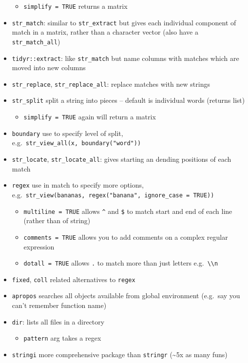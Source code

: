 \documentclass[]{book}
\providecommand{\tightlist}{%
  \setlength{\itemsep}{0pt}\setlength{\parskip}{0pt}}
\theoremstyle{definition}
\theoremstyle{definition}
\theoremstyle{definition}
\theoremstyle{remark}
\begin{document}
\begin{itemize}
  \begin{itemize}
  \tightlist
  \item
    \texttt{simplify\ =\ TRUE} returns a matrix
  \end{itemize}
\item
  \texttt{str\_match}: similar to \texttt{str\_extract} but gives each
  individual component of match in a matrix, rather than a character
  vector (also have a \texttt{str\_match\_all})
\item
  \texttt{tidyr::extract}: like \texttt{str\_match} but name columns
  with matches which are moved into new columns
\item
  \texttt{str\_replace}, \texttt{str\_replace\_all}: replace matches
  with new strings
\item
  \texttt{str\_split} split a string into pieces -- default is
  individual words (returns list)

  \begin{itemize}
  \tightlist
  \item
    \texttt{simplify\ =\ TRUE} again will return a matrix
  \end{itemize}
\item
  \texttt{boundary} use to specify level of split,
  e.g.~\texttt{str\_view\_all(x,\ boundary("word"))}
\item
  \texttt{str\_locate}, \texttt{str\_locate\_all}: gives starting an
  dending positions of each match
\item
  \texttt{regex} use in match to specify more options,
  e.g.~\texttt{str\_view(bananas,\ regex("banana",\ ignore\_case\ =\ TRUE))}

  \begin{itemize}
  \tightlist
  \item
    \texttt{multiline\ =\ TRUE} allows \texttt{\^{}} and \texttt{\$} to
    match start and end of each line (rather than of string)
  \item
    \texttt{comments\ =\ TRUE} allows you to add comments on a complex
    regular expression
  \item
    \texttt{dotall\ =\ TRUE} allows \texttt{.} to match more than just
    letters e.g.~\texttt{\textbackslash{}\textbackslash{}n}
  \end{itemize}
\item
  \texttt{fixed}, \texttt{coll} related alternatives to \texttt{regex}
\item
  \texttt{apropos} searches all objects available from global
  environment (e.g.~say you can't remember function name)
\item
  \texttt{dir}: lists all files in a directory

  \begin{itemize}
  \tightlist
  \item
    \texttt{pattern} arg takes a regex
  \end{itemize}
\item
  \texttt{stringi} more comprehensive package than \texttt{stringr}
  (\textasciitilde{}5x as many funs)
\end{itemize}
\end{document}
